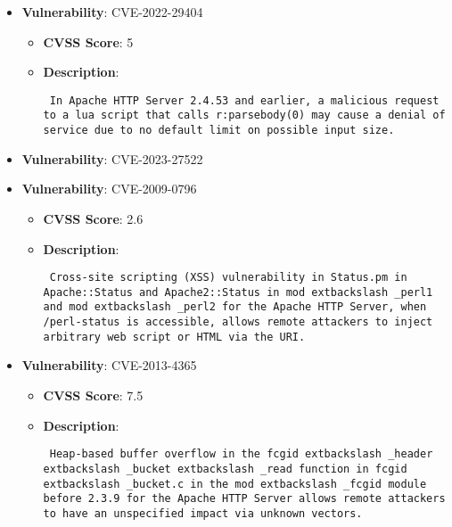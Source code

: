 \documentclass{article}
\begin{document}
\begin{itemize}
        \item \textbf{Vulnerability}: CVE-2022-29404
        \begin{itemize}
            \item \textbf{CVSS Score}:  5 
            \item \textbf{Description}: \parbox{\linewidth}{\texttt{ In Apache HTTP Server 2.4.53 and earlier, a malicious request to a lua script that calls r:parsebody(0) may cause a denial of service due to no default limit on possible input size. }}
        \end{itemize}
    
        \item \textbf{Vulnerability}: CVE-2023-27522
    
        \item \textbf{Vulnerability}: CVE-2009-0796
        \begin{itemize}
            \item \textbf{CVSS Score}:  2.6 
            \item \textbf{Description}: \parbox{\linewidth}{\texttt{ Cross-site scripting (XSS) vulnerability in Status.pm in Apache::Status and Apache2::Status in mod	extbackslash _perl1 and mod	extbackslash _perl2 for the Apache HTTP Server, when /perl-status is accessible, allows remote attackers to inject arbitrary web script or HTML via the URI. }}
        \end{itemize}
    
        \item \textbf{Vulnerability}: CVE-2013-4365
        \begin{itemize}
            \item \textbf{CVSS Score}:  7.5 
            \item \textbf{Description}: \parbox{\linewidth}{\texttt{ Heap-based buffer overflow in the fcgid	extbackslash _header	extbackslash _bucket	extbackslash _read function in fcgid	extbackslash _bucket.c in the mod	extbackslash _fcgid module before 2.3.9 for the Apache HTTP Server allows remote attackers to have an unspecified impact via unknown vectors. }}
        \end{itemize}
    

\end{itemize}
\end{document}
